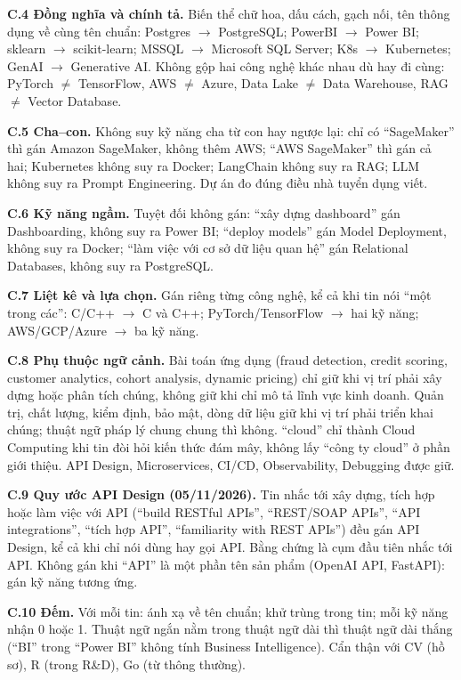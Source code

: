 \documentclass[12pt]{article}
\begin{document}
\textbf{C.4 Đồng nghĩa và chính tả.} Biến thể chữ hoa, dấu cách, gạch nối, tên thông dụng về cùng tên chuẩn: Postgres $\rightarrow$ PostgreSQL; PowerBI $\rightarrow$ Power BI; sklearn $\rightarrow$ scikit-learn; MSSQL $\rightarrow$ Microsoft SQL Server; K8s $\rightarrow$ Kubernetes; GenAI $\rightarrow$ Generative AI. Không gộp hai công nghệ khác nhau dù hay đi cùng: PyTorch $\ne$ TensorFlow, AWS $\ne$ Azure, Data Lake $\ne$ Data Warehouse, RAG $\ne$ Vector Database.

\textbf{C.5 Cha--con.} Không suy kỹ năng cha từ con hay ngược lại: chỉ có ``SageMaker'' thì gán Amazon SageMaker, không thêm AWS; ``AWS SageMaker'' thì gán cả hai; Kubernetes không suy ra Docker; LangChain không suy ra RAG; LLM không suy ra Prompt Engineering. Dự án đo đúng điều nhà tuyển dụng viết.

\textbf{C.6 Kỹ năng ngầm.} Tuyệt đối không gán: ``xây dựng dashboard'' gán Dashboarding, không suy ra Power BI; ``deploy models'' gán Model Deployment, không suy ra Docker; ``làm việc với cơ sở dữ liệu quan hệ'' gán Relational Databases, không suy ra PostgreSQL.

\textbf{C.7 Liệt kê và lựa chọn.} Gán riêng từng công nghệ, kể cả khi tin nói ``một trong các'': C/C++ $\rightarrow$ C và C++; PyTorch/TensorFlow $\rightarrow$ hai kỹ năng; AWS/GCP/Azure $\rightarrow$ ba kỹ năng.

\textbf{C.8 Phụ thuộc ngữ cảnh.} Bài toán ứng dụng (fraud detection, credit scoring, customer analytics, cohort analysis, dynamic pricing) chỉ giữ khi vị trí phải xây dựng hoặc phân tích chúng, không giữ khi chỉ mô tả lĩnh vực kinh doanh. Quản trị, chất lượng, kiểm định, bảo mật, dòng dữ liệu giữ khi vị trí phải triển khai chúng; thuật ngữ pháp lý chung chung thì không. ``cloud'' chỉ thành Cloud Computing khi tin đòi hỏi kiến thức đám mây, không lấy ``công ty cloud'' ở phần giới thiệu. API Design, Microservices, CI/CD, Observability, Debugging được giữ.

\textbf{C.9 Quy ước API Design (05/11/2026).} Tin nhắc tới xây dựng, tích hợp hoặc làm việc với API (``build RESTful APIs'', ``REST/SOAP APIs'', ``API integrations'', ``tích hợp API'', ``familiarity with REST APIs'') đều gán API Design, kể cả khi chỉ nói dùng hay gọi API. Bằng chứng là cụm đầu tiên nhắc tới API. Không gán khi ``API'' là một phần tên sản phẩm (OpenAI API, FastAPI): gán kỹ năng tương ứng.

\textbf{C.10 Đếm.} Với mỗi tin: ánh xạ về tên chuẩn; khử trùng trong tin; mỗi kỹ năng nhận 0 hoặc 1. Thuật ngữ ngắn nằm trong thuật ngữ dài thì thuật ngữ dài thắng (``BI'' trong ``Power BI'' không tính Business Intelligence). Cẩn thận với CV (hồ sơ), R (trong R\&D), Go (từ thông thường).
\end{document}
